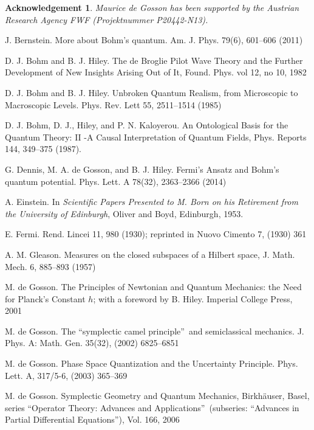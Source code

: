 \documentclass[12pt]{article}%
\newtheorem{acknowledgement}[theorem]{Acknowledgement}
\begin{document}
\begin{acknowledgement}
Maurice de Gosson has been supported by the Austrian Research Agency FWF
(Projektnummer P20442-N13).
\end{acknowledgement}

\begin{thebibliography}{99}                                                                                               %


J. Bernstein. More about Bohm's quantum. Am. J. Phys.
79(6), 601--606 (2011)

D. J. Bohm and B. J. Hiley. The de Broglie Pilot Wave
Theory and the Further Development of New Insights Arising Out of It, Found.
Phys. vol 12, no 10, 1982

D. J. Bohm and B. J. Hiley. Unbroken Quantum Realism, from
Microscopic to Macroscopic Levels. Phys. Rev. Lett 55, 2511--1514 (1985)

D. J. Bohm, D. J., Hiley, and P. N. Kaloyerou. An
Ontological Basis for the Quantum Theory: II -A Causal Interpretation of
Quantum Fields, Phys. Reports 144, 349--375 (1987).

G. Dennis, M. A. de Gosson, and B. J. Hiley. Fermi's Ansatz
and Bohm's quantum potential. Phys. Lett. A 78(32), 2363--2366 (2014)

A. Einstein. In \emph{Scientific Papers Presented to M. Born on
his Retirement from the University of Edinburgh}, Oliver and Boyd, Edinburgh, 1953.

E. Fermi. Rend. Lincei 11, 980 (1930); reprinted in Nuovo
Cimento 7, (1930) 361

A. M. Gleason. Measures on the closed subspaces of a Hilbert
space, J. Math. Mech. 6, 885--893 (1957)

M. de Gosson. The Principles of Newtonian and Quantum Mechanics:
the Need for Planck's Constant $h$; with a foreword by B. Hiley. Imperial
College Press, 2001

M. de Gosson. The \textquotedblleft symplectic camel
principle\textquotedblright\ and semiclassical mechanics. J. Phys. A: Math.
Gen. 35(32), (2002) 6825--6851

M. de Gosson. Phase Space Quantization and the Uncertainty
Principle. Phys. Lett. A, 317/5-6, (2003) 365--369

M. de Gosson. Symplectic Geometry and Quantum Mechanics,
Birkh\"{a}user, Basel, series \textquotedblleft Operator Theory: Advances and
Applications\textquotedblright\ (subseries: \textquotedblleft Advances in
Partial Differential Equations\textquotedblright), Vol. 166, 2006


\end{thebibliography}
\end{document}
